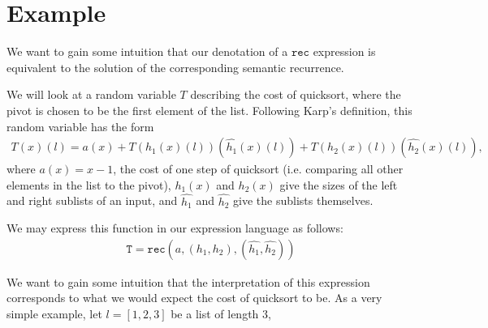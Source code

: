 \section{Example}
We want to gain some intuition that our denotation of a $\texttt{rec}$ expression is equivalent to the solution of
the corresponding semantic recurrence. 

We will look at a random variable $T$ describing the cost of quicksort, where the pivot is chosen to be the first element 
of the list. Following Karp's definition, this random variable has the form 
\begin{align*}
T(x)(l) = a(x) + T(h_1(x)(l))(\hat{h_1}(x)(l)) + T(h_2(x)(l))(\hat{h_2}(x)(l)), 
\end{align*}
where $a(x) = x-1$, the cost of one step of quicksort (i.e. comparing all other elements
in the list to the pivot), $h_1(x)$ and $h_2(x)$ give the sizes of the left and right sublists of an input, and
$\hat{h_1}$ and $\hat{h_2}$ give the sublists themselves. 

We may express this function in our expression language
as follows:
\begin{align*}
\texttt{T} = \texttt{rec}(a, (h_1, h_2), (\hat{h_1}, \hat{h_2}))
\end{align*}
 
 We want to gain some intuition that the interpretation of this expression corresponds to what we would expect
 the cost of quicksort to be. As a very simple example, let $l = [1,2,3]$ be a list of length $3$,

